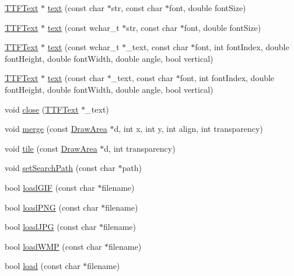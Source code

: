 \begin{DoxyCompactItemize}
\item 
\hyperlink{class_t_t_f_text}{T\+T\+F\+Text} $\ast$ \hyperlink{class_draw_area_a5c05c0f1f76ff3b364cf4cf25de6e1a0}{text} (const char $\ast$str, const char $\ast$font, double font\+Size)
\item 
\hyperlink{class_t_t_f_text}{T\+T\+F\+Text} $\ast$ \hyperlink{class_draw_area_ac71c035d2b44bb229767ec3fb3c9b505}{text} (const wchar\+\_\+t $\ast$str, const char $\ast$font, double font\+Size)
\item 
\hyperlink{class_t_t_f_text}{T\+T\+F\+Text} $\ast$ \hyperlink{class_draw_area_aaab26901803c8e2946efcf11f6b63839}{text} (const wchar\+\_\+t $\ast$\+\_\+text, const char $\ast$font, int font\+Index, double font\+Height, double font\+Width, double angle, bool vertical)
\item 
\hyperlink{class_t_t_f_text}{T\+T\+F\+Text} $\ast$ \hyperlink{class_draw_area_ad861166eb9e2280d51a0e68dd03f496b}{text} (const char $\ast$\+\_\+text, const char $\ast$font, int font\+Index, double font\+Height, double font\+Width, double angle, bool vertical)
\item 
void \hyperlink{class_draw_area_af8f45b9c5fa29730b43267eda865b10a}{close} (\hyperlink{class_t_t_f_text}{T\+T\+F\+Text} $\ast$\+\_\+text)
\item 
void \hyperlink{class_draw_area_a97253516094836632b2df9204dcc1155}{merge} (const \hyperlink{class_draw_area}{Draw\+Area} $\ast$d, int x, int y, int align, int transparency)
\item 
void \hyperlink{class_draw_area_af73b2087afdb68990aa4f1ccfb2bcb03}{tile} (const \hyperlink{class_draw_area}{Draw\+Area} $\ast$d, int transparency)
\item 
void \hyperlink{class_draw_area_ac5eedef9ea6349bdd1d495a7b59cb104}{set\+Search\+Path} (const char $\ast$path)
\item 
bool \hyperlink{class_draw_area_acfa51d737299f007c15e38e9c71c6d74}{load\+G\+IF} (const char $\ast$filename)
\item 
bool \hyperlink{class_draw_area_af5b2dd1d6eb5c3f973ad3fbe1c4d9a60}{load\+P\+NG} (const char $\ast$filename)
\item 
bool \hyperlink{class_draw_area_a9c72a759f1b0f166272994a5f42362bf}{load\+J\+PG} (const char $\ast$filename)
\item 
bool \hyperlink{class_draw_area_a4681d7c6e3a8f24252cecc0882da7c24}{load\+W\+MP} (const char $\ast$filename)
\item 
bool \hyperlink{class_draw_area_a4b52e06f246a047d3c9bff043fe300c3}{load} (const char $\ast$filename)

\end{DoxyCompactItemize}
